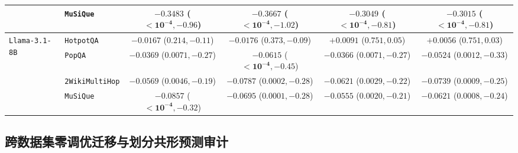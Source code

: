 \documentclass[11pt]{article}
\begin{document}
\begin{table}[t]
{\begin{tabular}{llcccc}
& \texttt{MuSiQue} & $\mathbf{-0.3483}$ ($\mathbf{<10^{-4}}, -0.96$) & $\mathbf{-0.3667}$ ($\mathbf{<10^{-4}}, -1.02$) & $\mathbf{-0.3049}$ ($\mathbf{<10^{-4}}, -0.81$) & $\mathbf{-0.3015}$ ($\mathbf{<10^{-4}}, -0.81$) \\
\midrule
\multirow{4}{*}{\texttt{Llama-3.1-8B}}
& \texttt{HotpotQA} & $-0.0167$ ($0.214, -0.11$) & $-0.0176$ ($0.373, -0.09$) & $+0.0091$ ($0.751, 0.05$) & $+0.0056$ ($0.751, 0.03$) \\
& \texttt{PopQA} & $\mathbf{-0.0369}$ ($\mathbf{0.0071}, -0.27$) & $\mathbf{-0.0615}$ ($\mathbf{<10^{-4}}, -0.45$) & $\mathbf{-0.0366}$ ($\mathbf{0.0071}, -0.27$) & $\mathbf{-0.0524}$ ($\mathbf{0.0012}, -0.33$) \\
& \texttt{2WikiMultiHop} & $\mathbf{-0.0569}$ ($\mathbf{0.0046}, -0.19$) & $\mathbf{-0.0787}$ ($\mathbf{0.0002}, -0.28$) & $\mathbf{-0.0621}$ ($\mathbf{0.0029}, -0.22$) & $\mathbf{-0.0739}$ ($\mathbf{0.0009}, -0.25$) \\
& \texttt{MuSiQue} & $\mathbf{-0.0857}$ ($\mathbf{<10^{-4}}, -0.32$) & $\mathbf{-0.0695}$ ($\mathbf{0.0001}, -0.28$) & $\mathbf{-0.0555}$ ($\mathbf{0.0020}, -0.21$) & $\mathbf{-0.0621}$ ($\mathbf{0.0008}, -0.24$) \\
\bottomrule
\end{tabular}
}
\end{table}

\subsection{跨数据集零调优迁移与划分共形预测审计}
\end{document}
